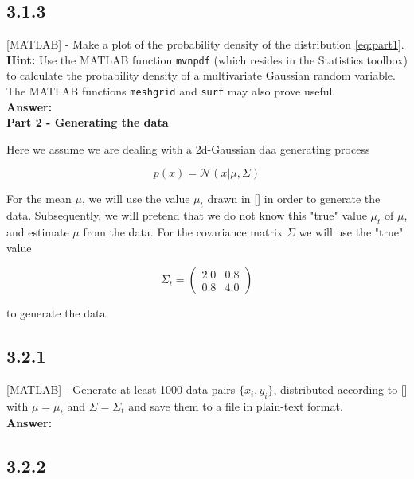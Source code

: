 \documentclass[a4paper]{article}
\begin{document}
\subsection*{3.1.3}

[MATLAB] - Make a plot of the probability density of the distribution \ref{eq:part1}.\\

\textbf{Hint:} Use the MATLAB function \texttt{mvnpdf} (which resides in the Statistics toolbox) to calculate the probability density of a multivariate Gaussian random variable. The MATLAB functions \texttt{meshgrid} and \texttt{surf} may also prove useful.\\


\textbf{Answer:}\\

\textbf{Part 2 - Generating the data}

Here we assume we are dealing with a 2d-Gaussian daa generating process

\begin{equation}
	p(x) = \mathcal{N}(x|\mu, \Sigma)
\end{equation}

For the mean $\mu$, we will use the value $\mu_t$ drawn in \ref{} in order to generate the data. Subsequently, we will pretend that we do not know this "true" value $\mu_t$ of $\mu$, and estimate $\mu$ from the data. For the covariance matrix $\Sigma$ we will use the "true" value

\[ \Sigma_t = \left( \begin{array}{cc}
2.0 & 0.8  \\
0.8 & 4.0 \end{array} \right)\] 

to generate the data.


\subsection*{3.2.1}

[MATLAB] - Generate at least 1000 data pairs $\{ x_i, y_i\}$, distributed according to \ref{} with $\mu = \mu_t$ and $\Sigma = \Sigma_t$ and save them to a file in plain-text format.\\

\textbf{Answer:}\\



\subsection*{3.2.2}
\end{document}
